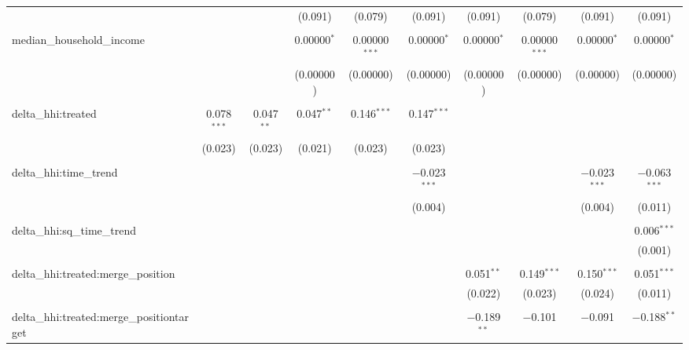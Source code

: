 \begin{table}[H]
{\begin{tabular}{@{\extracolsep{5pt}}lccccccccc}
   &  &  & (0.091) & (0.079) & (0.091) & (0.091) & (0.079) & (0.091) & (0.091) \\  

   & & & & & & & & & \\  

  median\_household\_income &  &  & 0.00000$^{*}$ & 0.00000$^{***}$ & 0.00000$^{*}$ & 0.00000$^{*}$ & 0.00000$^{***}$ & 0.00000$^{*}$ & 0.00000$^{*}$ \\  

   &  &  & (0.00000) & (0.00000) & (0.00000) & (0.00000) & (0.00000) & (0.00000) & (0.00000) \\  

   & & & & & & & & & \\  

  delta\_hhi:treated & 0.078$^{***}$ & 0.047$^{**}$ & 0.047$^{**}$ & 0.146$^{***}$ & 0.147$^{***}$ &  &  &  &  \\  

   & (0.023) & (0.023) & (0.021) & (0.023) & (0.023) &  &  &  &  \\  

   & & & & & & & & & \\  

  delta\_hhi:time\_trend &  &  &  &  & $-$0.023$^{***}$ &  &  & $-$0.023$^{***}$ & $-$0.063$^{***}$ \\  

   &  &  &  &  & (0.004) &  &  & (0.004) & (0.011) \\  

   & & & & & & & & & \\  

  delta\_hhi:sq\_time\_trend &  &  &  &  &  &  &  &  & 0.006$^{***}$ \\  

   &  &  &  &  &  &  &  &  & (0.001) \\  

   & & & & & & & & & \\  

  delta\_hhi:treated:merge\_position &  &  &  &  &  & 0.051$^{**}$ & 0.149$^{***}$ & 0.150$^{***}$ & 0.051$^{***}$ \\  

   &  &  &  &  &  & (0.022) & (0.023) & (0.024) & (0.011) \\  

   & & & & & & & & & \\  

  delta\_hhi:treated:merge\_positiontarget &  &  &  &  &  & $-$0.189$^{**}$ & $-$0.101 & $-$0.091 & $-$0.188$^{**}$ \\  


\end{tabular}}
\end{table}
